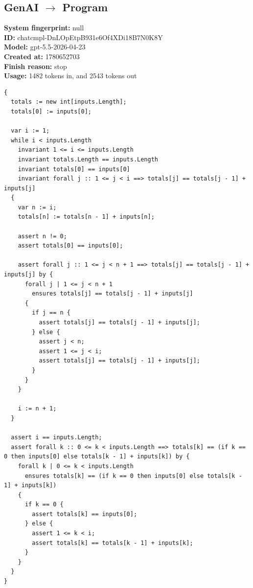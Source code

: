\documentclass{article}
\begin{document}
\subsection*{GenAI $\rightarrow$ Program}
\textbf{System fingerprint: }null
\\\textbf{ID: }chatcmpl-DnLOpEtpB931e6Of4XDi18B7N0K8Y
\\\textbf{Model: }gpt-5.5-2026-04-23
\\\textbf{Created at: }1780652703
\\\textbf{Finish reason: }stop
\\\textbf{Usage: }1482 tokens in, and 2543 tokens out
\begin{lstlisting}
{
  totals := new int[inputs.Length];
  totals[0] := inputs[0];

  var i := 1;
  while i < inputs.Length
    invariant 1 <= i <= inputs.Length
    invariant totals.Length == inputs.Length
    invariant totals[0] == inputs[0]
    invariant forall j :: 1 <= j < i ==> totals[j] == totals[j - 1] + inputs[j]
  {
    var n := i;
    totals[n] := totals[n - 1] + inputs[n];

    assert n != 0;
    assert totals[0] == inputs[0];

    assert forall j :: 1 <= j < n + 1 ==> totals[j] == totals[j - 1] + inputs[j] by {
      forall j | 1 <= j < n + 1
        ensures totals[j] == totals[j - 1] + inputs[j]
      {
        if j == n {
          assert totals[j] == totals[j - 1] + inputs[j];
        } else {
          assert j < n;
          assert 1 <= j < i;
          assert totals[j] == totals[j - 1] + inputs[j];
        }
      }
    }

    i := n + 1;
  }

  assert i == inputs.Length;
  assert forall k :: 0 <= k < inputs.Length ==> totals[k] == (if k == 0 then inputs[0] else totals[k - 1] + inputs[k]) by {
    forall k | 0 <= k < inputs.Length
      ensures totals[k] == (if k == 0 then inputs[0] else totals[k - 1] + inputs[k])
    {
      if k == 0 {
        assert totals[k] == inputs[0];
      } else {
        assert 1 <= k < i;
        assert totals[k] == totals[k - 1] + inputs[k];
      }
    }
  }
}
\end{lstlisting}
\end{document}
